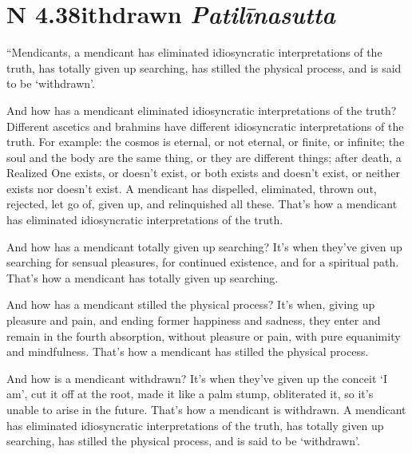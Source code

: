 \documentclass[12pt,openany]{book}%
\newcommand*{\suttatitleacronym}[1]{\smaller[2]{#1}\vspace*{.3em}}
\newcommand*{\suttatitletranslation}[1]{\linebreak{#1}}
\newcommand*{\suttatitleroot}[1]{\linebreak\smaller[2]\itshape{#1}}
\newcommand*{\tocacronym}[1]{\hspace*{-3.3em}{#1}\quad}
\newcommand*{\toctranslation}[1]{#1}
\newcommand*{\tocroot}[1]{(\textit{#1})}
\begin{document}
%
\section*{{\suttatitleacronym AN 4.38}{\suttatitletranslation Withdrawn }{\suttatitleroot Patilīnasutta}}
\addcontentsline{toc}{section}{\tocacronym{AN 4.38} \toctranslation{Withdrawn } \tocroot{Patilīnasutta}}

“Mendicants, a mendicant has eliminated idiosyncratic interpretations of the truth, has totally given up searching, has stilled the physical process, and is said to be ‘withdrawn’. 

And how has a mendicant eliminated idiosyncratic interpretations of the truth? Different ascetics and brahmins have different idiosyncratic interpretations of the truth. For example: the cosmos is eternal, or not eternal, or finite, or infinite; the soul and the body are the same thing, or they are different things; after death, a Realized One exists, or doesn’t exist, or both exists and doesn’t exist, or neither exists nor doesn’t exist. A mendicant has dispelled, eliminated, thrown out, rejected, let go of, given up, and relinquished all these. That’s how a mendicant has eliminated idiosyncratic interpretations of the truth. 

And how has a mendicant totally given up searching? It’s when they’ve given up searching for sensual pleasures, for continued existence, and for a spiritual path. That’s how a mendicant has totally given up searching. 

And how has a mendicant stilled the physical process? It’s when, giving up pleasure and pain, and ending former happiness and sadness, they enter and remain in the fourth absorption, without pleasure or pain, with pure equanimity and mindfulness. That’s how a mendicant has stilled the physical process. 

And how is a mendicant withdrawn? It’s when they’ve given up the conceit ‘I am’, cut it off at the root, made it like a palm stump, obliterated it, so it’s unable to arise in the future. That’s how a mendicant is withdrawn. A mendicant has eliminated idiosyncratic interpretations of the truth, has totally given up searching, has stilled the physical process, and is said to be ‘withdrawn’. 
\end{document}
